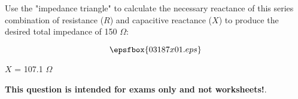 

Use the "impedance triangle" to calculate the necessary reactance of this series combination of resistance ($R$) and capacitive reactance ($X$) to produce the desired total impedance of 150 $\Omega$:

$$\epsfbox{03187x01.eps}$$







$X$ = 107.1 $\Omega$







{\bf This question is intended for exams only and not worksheets!}.




